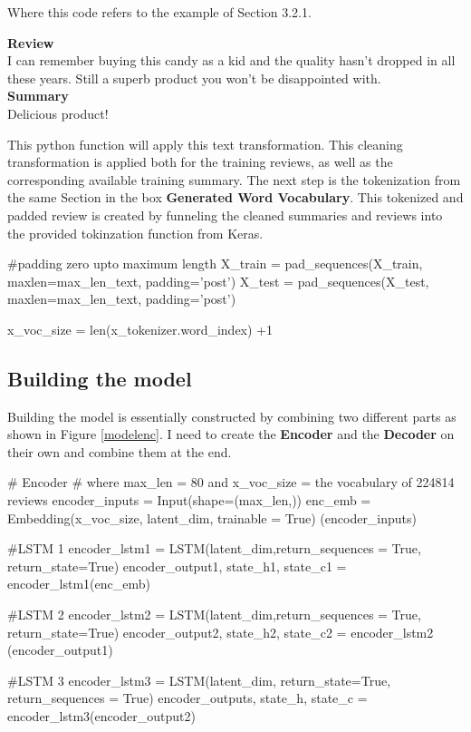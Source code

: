 Where this code refers to the example of Section 3.2.1. 

\begin{tcolorbox}
	\textbf{Review} \\
	I can remember buying this candy as a kid and the quality hasn't dropped in all these years. Still a superb product you won't be disappointed with. \\
	
	\textbf{Summary} \\
	Delicious product!
\end{tcolorbox}

This python function will apply this text transformation. This cleaning transformation is applied both for the training reviews, as well as the corresponding available training summary. The next step is the tokenization from the same Section in the box \textbf{Generated Word Vocabulary}.
This tokenized and padded review is created by funneling the cleaned summaries and reviews into the provided tokinzation function from Keras.

\begin{python}
	#padding zero upto maximum length
	X_train = pad_sequences(X_train,  maxlen=max_len_text, padding='post') 
	X_test = pad_sequences(X_test, maxlen=max_len_text, padding='post')
	
	x_voc_size = len(x_tokenizer.word_index) +1
\end{python}


\subsection{Building the model}

Building the model is essentially constructed by combining two different parts as shown in Figure \ref{modelenc}. I need to create the \textbf{Encoder} and the \textbf{Decoder} on their own and combine them at the end.

\begin{python}[caption={Encoder in Python}]
# Encoder 
# where max_len = 80 and x_voc_size = the vocabulary of 224814 reviews
encoder_inputs = Input(shape=(max_len,)) 
enc_emb = Embedding(x_voc_size, latent_dim, trainable = True)
(encoder_inputs) 

#LSTM 1 
encoder_lstm1 = LSTM(latent_dim,return_sequences = True, return_state=True) 
encoder_output1, state_h1, state_c1 = encoder_lstm1(enc_emb) 

#LSTM 2 
encoder_lstm2 = LSTM(latent_dim,return_sequences = True, return_state=True) 
encoder_output2, state_h2, state_c2 = encoder_lstm2
(encoder_output1) 

#LSTM 3 
encoder_lstm3  = LSTM(latent_dim, return_state=True, 
return_sequences = True) 
encoder_outputs, state_h, state_c = encoder_lstm3(encoder_output2) 
\end{python} 


